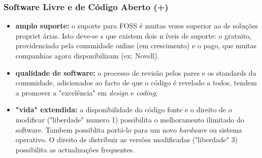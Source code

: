 \documentclass[hyperref={pdfpagelabels=true}]{beamer}
\begin{document}
\begin{frame}
\frametitle{Software Livre e de C\'{o}digo Aberto (+)}
\small{
    \begin{itemize}
      \item<1-> \textbf{amplo suporte:} o suporte para FOSS \'{e} muitas vezes superior ao de solu\c{c}\~{o}es propriet \'{a}rias. Isto deve-se s que existem dois n \'{i}veis de suporte: o gratuito, providenciado pela comunidade online (em crescimento) e o pago, que muitas companhias agora disponibilizam (ex: Novell).%
      \item<2-> \textbf{qualidade de software:} o processo de revis\~{a}o pelos pares e os standards da comunidade, adicionados ao facto de que o c\'{o}digo \'{e} revelado a todos, tendem a promover a "excel\^{e}ncia" em \textit{design} e \textit{coding};
      \item<3-> \textbf{"vida" extendida:} a disponibilidade do c\'{o}digo fonte e o direito de o modificar ("liberdade" numero 1) possibilita o melhoramento ilimitado do software. Tambem possiblita port\'{a}-lo para um novo \textit{hardware} ou sistema operativo. O direito de distribuir as vers\~{o}es modificadas ("liberdade" 3) possibilita as actualiza\c{c}\~{o}es frequentes.
      \end{itemize}
}
\end{frame}

\end{document}
